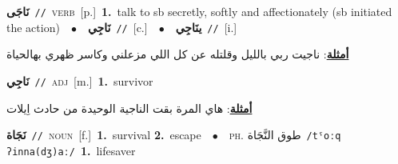 \documentclass[10pt,a4paper,twoside]{article} %
\begin{document}
\begin{multicols}{2}
{\setlength\topsep{0pt}\textbf{\foreignlanguage{arabic}{نَاجَى}}\ {\color{gray}\texttt{//}\color{black}}\ \textsc{verb}\ [p.]\ \textbf{1.}~talk to sb secretly, softly and affectionately (sb initiated the action)\ \ $\bullet$\ \ \setlength\topsep{0pt}\textbf{\foreignlanguage{arabic}{نَاجِي}}\ {\color{gray}\texttt{//}\color{black}}\ [c.]\ \ $\bullet$\ \ \setlength\topsep{0pt}\textbf{\foreignlanguage{arabic}{ينَاجِي}}\ {\color{gray}\texttt{//}\color{black}}\ [i.]\  \begin{flushright}\color{gray}\foreignlanguage{arabic}{\textbf{\underline{\foreignlanguage{arabic}{أمثلة}}}: ناجيت ربي بالليل وقلتله عن كل اللي مزعلني وكاسر ظهري بهالحياة}\end{flushright}\color{black}} \vspace{2mm}

{\setlength\topsep{0pt}\textbf{\foreignlanguage{arabic}{نَاجِي}}\ {\color{gray}\texttt{//}\color{black}}\ \textsc{adj}\ [m.]\ \textbf{1.}~survivor\  \begin{flushright}\color{gray}\foreignlanguage{arabic}{\textbf{\underline{\foreignlanguage{arabic}{أمثلة}}}: هاي المرة بقت الناجية الوحيدة من حادث اِيلات}\end{flushright}\color{black}} \vspace{2mm}

{\setlength\topsep{0pt}\textbf{\foreignlanguage{arabic}{نَجَاة}}\ {\color{gray}\texttt{//}\color{black}}\ \textsc{noun}\ [f.]\ \textbf{1.}~survival  \textbf{2.}~escape\ \ $\bullet$\ \ \textsc{ph.} \color{gray} \foreignlanguage{arabic}{طوق النَّجَاة}\color{black}\ {\color{gray}\texttt{/{\sffamily tˤoːq ʔinna(dʒ)aː}/}\color{black}}\ \textbf{1.}~lifesaver\ } \vspace{2mm}


\end{multicols}
\end{document}
